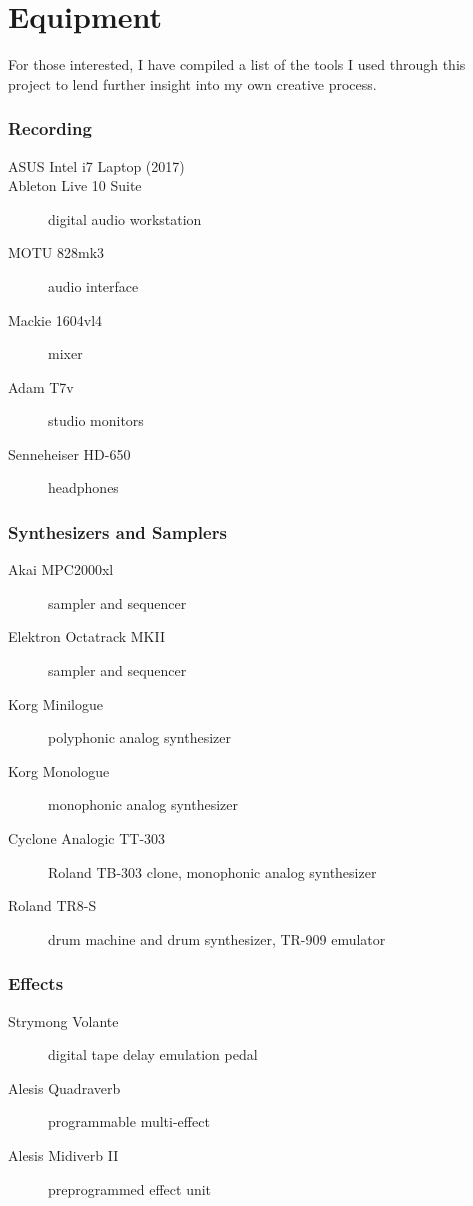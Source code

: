 \documentclass[12pt,twoside]{reedthesis}
\begin{document}
\chapter{Equipment}

For those interested, I have compiled a list of the tools I used through this project to lend further insight into my own creative process.
\subsection{Recording}
\begin{description}
    \item [ASUS Intel i7 Laptop (2017)]
    \item [Ableton Live 10 Suite] digital audio workstation
    \item [MOTU 828mk3] audio interface
    \item [Mackie 1604vl4] mixer
    \item [Adam T7v] studio monitors
    \item [Senneheiser HD-650] headphones
\end{description}
\subsection{Synthesizers and Samplers}
\begin{description}
    \item [Akai MPC2000xl] sampler and sequencer
    \item [Elektron Octatrack MKII] sampler and sequencer
    \item[Korg Minilogue] polyphonic analog synthesizer
    \item[Korg Monologue] monophonic analog synthesizer
    \item[Cyclone Analogic TT-303] Roland TB-303 clone, monophonic analog synthesizer
    \item[Roland TR8-S] drum machine and drum synthesizer, TR-909 emulator
\end{description}
\subsection{Effects}
\begin{description}
    \item[Strymong Volante] digital tape delay emulation pedal
    \item[Alesis Quadraverb] programmable multi-effect
    \item[Alesis Midiverb II] preprogrammed effect unit
\end{description}
\end{document}

